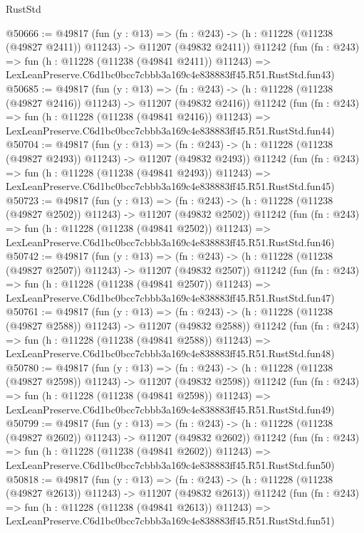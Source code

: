 \begin{lexlean}{RustStd}
\begin{coremodule}
@50666 := @49817
    (fun (y : @13) =>
    (fn : @243) -> (h : @11228 (@11238 (@49827 @2411)) @11243) -> @11207 (@49832 @2411))
    @11242
    (fun (fn : @243) =>
    fun (h : @11228 (@11238 (@49841 @2411)) @11243) =>
    LexLeanPreserve.C6d1bc0bcc7cbbb3a169c4e838883ff45.R51.RustStd.fun43)
@50685 := @49817
    (fun (y : @13) =>
    (fn : @243) -> (h : @11228 (@11238 (@49827 @2416)) @11243) -> @11207 (@49832 @2416))
    @11242
    (fun (fn : @243) =>
    fun (h : @11228 (@11238 (@49841 @2416)) @11243) =>
    LexLeanPreserve.C6d1bc0bcc7cbbb3a169c4e838883ff45.R51.RustStd.fun44)
@50704 := @49817
    (fun (y : @13) =>
    (fn : @243) -> (h : @11228 (@11238 (@49827 @2493)) @11243) -> @11207 (@49832 @2493))
    @11242
    (fun (fn : @243) =>
    fun (h : @11228 (@11238 (@49841 @2493)) @11243) =>
    LexLeanPreserve.C6d1bc0bcc7cbbb3a169c4e838883ff45.R51.RustStd.fun45)
@50723 := @49817
    (fun (y : @13) =>
    (fn : @243) -> (h : @11228 (@11238 (@49827 @2502)) @11243) -> @11207 (@49832 @2502))
    @11242
    (fun (fn : @243) =>
    fun (h : @11228 (@11238 (@49841 @2502)) @11243) =>
    LexLeanPreserve.C6d1bc0bcc7cbbb3a169c4e838883ff45.R51.RustStd.fun46)
@50742 := @49817
    (fun (y : @13) =>
    (fn : @243) -> (h : @11228 (@11238 (@49827 @2507)) @11243) -> @11207 (@49832 @2507))
    @11242
    (fun (fn : @243) =>
    fun (h : @11228 (@11238 (@49841 @2507)) @11243) =>
    LexLeanPreserve.C6d1bc0bcc7cbbb3a169c4e838883ff45.R51.RustStd.fun47)
@50761 := @49817
    (fun (y : @13) =>
    (fn : @243) -> (h : @11228 (@11238 (@49827 @2588)) @11243) -> @11207 (@49832 @2588))
    @11242
    (fun (fn : @243) =>
    fun (h : @11228 (@11238 (@49841 @2588)) @11243) =>
    LexLeanPreserve.C6d1bc0bcc7cbbb3a169c4e838883ff45.R51.RustStd.fun48)
@50780 := @49817
    (fun (y : @13) =>
    (fn : @243) -> (h : @11228 (@11238 (@49827 @2598)) @11243) -> @11207 (@49832 @2598))
    @11242
    (fun (fn : @243) =>
    fun (h : @11228 (@11238 (@49841 @2598)) @11243) =>
    LexLeanPreserve.C6d1bc0bcc7cbbb3a169c4e838883ff45.R51.RustStd.fun49)
@50799 := @49817
    (fun (y : @13) =>
    (fn : @243) -> (h : @11228 (@11238 (@49827 @2602)) @11243) -> @11207 (@49832 @2602))
    @11242
    (fun (fn : @243) =>
    fun (h : @11228 (@11238 (@49841 @2602)) @11243) =>
    LexLeanPreserve.C6d1bc0bcc7cbbb3a169c4e838883ff45.R51.RustStd.fun50)
@50818 := @49817
    (fun (y : @13) =>
    (fn : @243) -> (h : @11228 (@11238 (@49827 @2613)) @11243) -> @11207 (@49832 @2613))
    @11242
    (fun (fn : @243) =>
    fun (h : @11228 (@11238 (@49841 @2613)) @11243) =>
    LexLeanPreserve.C6d1bc0bcc7cbbb3a169c4e838883ff45.R51.RustStd.fun51)

\end{coremodule}
\end{lexlean}
